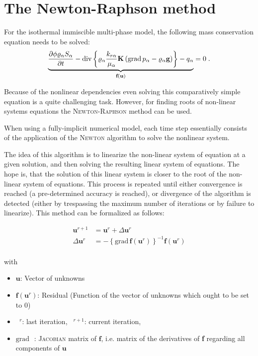\chapter{The Newton-Raphson method}

For the isothermal immiscible multi-phase model, the following mass
conservation equation needs to be solved:
\begin{align}
\underbrace{
  \frac{\partial \phi \varrho_\alpha S_\alpha}{\partial t}
 -
 \text{div} \left\{
 \varrho_\alpha \frac{k_{r\alpha}}{\mu_\alpha} \mbox{\textbf{K}} \left(\text{grad}\, p_\alpha - \varrho_{\alpha} \mbox{\textbf{g}} \right)
 \right\} - q_\alpha} _
{\textbf{f}(\textbf{u})}
= 0 \; .
\end{align}

Because of the nonlinear dependencies even solving this comparatively
simple equation is a quite challenging task. However, for
finding roots of non-linear systems equations the
\textsc{Newton}-\textsc{Raphson} method can be used.

When using a fully-implicit numerical model, each time step essentially
consists of the application of the \textsc{Newton} algorithm to solve
the nonlinear system.

The idea of this algorithm is to linearize the non-linear system of
equation at a given solution, and then solving the resulting linear
system of equations. The hope is, that the solution of this linear
system is closer to the root of the non-linear system of
equations. This process is repeated until either convergence is
reached (a pre-determined accuracy is reached), or divergence of the
algorithm is detected (either by trespassing the maximum number of
iterations or by failure to linearize). This method can be formalized
as follows:

\begin{subequations}
\begin{align}
\label{NewtonGen}
\textbf{u}^{r+1} &= \textbf{u}^r + \Delta \textbf{u}^r \\
\Delta \textbf{u}^r & = - \left\{\text{grad}\,\textbf{f} (\textbf{u}^r) \right\}^{-1} \textbf{f}(\textbf{u}^r) \\
\end{align}
\end{subequations}

\noindent with
\begin{itemize}
\item $\textbf{u}$: Vector of unknowns
\item $\textbf{f}(\textbf{u}^r)$: Residual (Function of the vector of unknowns which ought to be set to $0$)
\item $\phantom{a}^r$: last iteration, $\phantom{a}^{r+1}$: current iteration,
\item $\text{grad}\,\phantom{a}$: \textsc{Jacobian} matrix of
  $\textbf{f}$, i.e. matrix of the derivatives of \textbf{f} regarding
  all components of $\textbf{u}$
\end{itemize}

